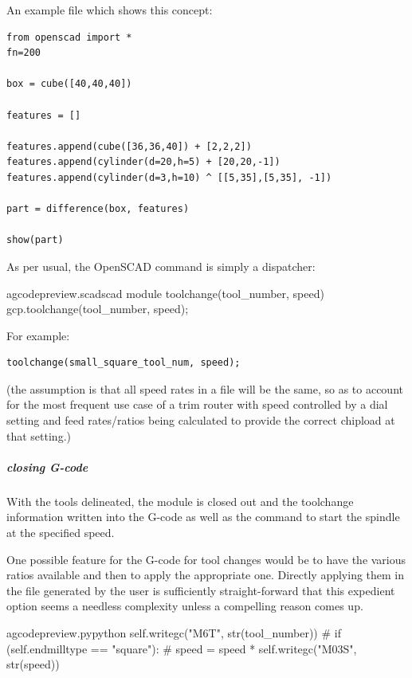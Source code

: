 \documentclass{ltxdoc}
\begin{document}
An example file which shows this concept:

\begin{verbatim}
from openscad import *
fn=200

box = cube([40,40,40])

features = []

features.append(cube([36,36,40]) + [2,2,2])
features.append(cylinder(d=20,h=5) + [20,20,-1])
features.append(cylinder(d=3,h=10) ^ [[5,35],[5,35], -1])

part = difference(box, features)

show(part)

\end{verbatim}

As per usual, the OpenSCAD command is simply a dispatcher:

\lstset{firstnumber=\thegcpscad}
\begin{writecode}{a}{gcodepreview.scad}{scad}
module toolchange(tool_number, speed){
    gcp.toolchange(tool_number, speed);
}

\end{writecode}
\addtocounter{gcpscad}{4}

\noindent For example:

\begin{verbatim}
toolchange(small_square_tool_num, speed);
\end{verbatim}

\noindent (the assumption is that all speed rates in a file will be the same, so as to account for the most frequent use case of a trim router with speed controlled by a dial setting and feed rates/ratios being calculated to provide the correct chipload at that setting.)

\subparagraph{closing G-code}

With the tools delineated, the module is closed out and the toolchange information written into the G-code as well as the command to start the spindle at the specified speed.

One possible feature for the G-code for tool changes would be to have the various ratios available and then to apply the appropriate one. Directly applying them in the file generated by the user is sufficiently straight-forward that this expedient option seems a needless complexity unless a compelling reason comes up.

\lstset{firstnumber=\thegcpy}
\begin{writecode}{a}{gcodepreview.py}{python}
        self.writegc("M6T", str(tool_number))
#        if (self.endmilltype == "square"):
#            speed = speed * 
        self.writegc("M03S", str(speed))

\end{writecode}
\addtocounter{gcpy}{5}
\end{document}
